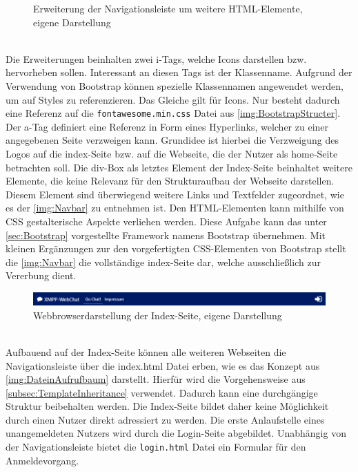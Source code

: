 \documentclass[a4paper,titlepage,halfparskip,12pt]{scrreprt}
\begin{document}
\begin{onehalfspacing}
\begin{figure}[h]
	\caption{Erweiterung der Navigationsleiste um weitere HTML-Elemente, eigene Darstellung}
	\label{img:index-strukturInhalt}
\end{figure}\\
Die Erweiterungen beinhalten zwei i-Tags, welche Icons darstellen bzw. hervorheben sollen. Interessant an diesen Tags ist der Klassenname. Aufgrund der Verwendung von Bootstrap können spezielle Klassennamen angewendet werden, um auf Styles zu referenzieren. Das Gleiche gilt für Icons. Nur besteht dadurch eine Referenz auf die \texttt{fontawesome.min.css} Datei aus \autoref{img:BootstrapStructer}. Der a-Tag definiert eine Referenz in Form eines Hyperlinks, welcher zu einer angegebenen Seite verzweigen kann. Grundidee ist hierbei die Verzweigung des Logos auf die index-Seite bzw. auf die Webseite, die der Nutzer als home-Seite betrachten soll. Die div-Box als letztes Element der Index-Seite beinhaltet weitere Elemente, die keine Relevanz für den Strukturaufbau der Webseite darstellen. Diesem Element sind überwiegend weitere Links und Textfelder zugeordnet, wie es der \autoref{img:Navbar} zu entnehmen ist. Den \ac{HTML}-Elementen kann mithilfe von \ac{CSS} gestalterische Aspekte verliehen werden. Diese Aufgabe kann das unter \autoref{sec:Bootstrap} vorgestellte Framework namens Bootstrap übernehmen. Mit kleinen Ergänzungen zur den vorgefertigten CSS-Elementen von Bootstrap stellt die \autoref{img:Navbar} die vollständige index-Seite dar, welche ausschließlich zur Vererbung dient. 
\begin{figure}[h]
	\centering
	\includegraphics[width=\linewidth]{images/indexHTML&CSS}
	\caption{Webbrowserdarstellung der Index-Seite, eigene Darstellung}
	\label{img:Navbar}
\end{figure}\\
Aufbauend auf der Index-Seite können alle weiteren Webseiten die Navigationsleiste über die index.html Datei erben, wie es das Konzept aus \autoref{img:DateinAufrufbaum} darstellt. Hierfür wird die Vorgehensweise aus \autoref{subsec:TemplateInheritance} verwendet. Dadurch kann eine durchgängige Struktur beibehalten werden. Die Index-Seite bildet daher keine Möglichkeit durch einen Nutzer direkt adressiert zu werden. Die erste Anlaufstelle eines unangemeldeten Nutzers wird durch die Login-Seite abgebildet. Unabhängig von der Navigationsleiste bietet die \texttt{login.html} Datei ein Formular für den Anmeldevorgang.


\end{onehalfspacing}
\end{document}
